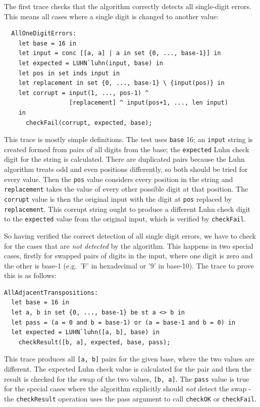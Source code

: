 \documentclass{overturerepchap}
\begin{document}
The first trace checks that the algorithm correctly detects all single-digit
errors. This means all cases where a single digit is changed to another value:

\small
\begin{lstlisting}
  AllOneDigitErrors:
    let base = 16 in
    let input = conc [[a, a] | a in set {0, ..., base-1}] in
    let expected = LUHN`luhn(input, base) in
    let pos in set inds input in
    let replacement in set {0, ..., base-1} \ {input(pos)} in
    let corrupt = input(1, ..., pos-1) ^
                  [replacement] ^ input(pos+1, ..., len input)
    in
      checkFail(corrupt, expected, base);
\end{lstlisting}
\normalsize

\noindent This trace is mostly simple definitions. The test uses \texttt{base}
16; an \texttt{input} string is created formed from pairs of all digits from the base;
the \texttt{expected} Luhn check digit for the string is calculated. There are
duplicated pairs because the Luhn algorithm treats odd and even positions
differently, so both should be tried for every value. Then the \texttt{pos}
value considers every position in the string and \texttt{replacement} takes the
value of every other possible digit at that position. The \texttt{corrupt}
value is then the original input with the digit at \texttt{pos} replaced by
\texttt{replacement}. This corrupt string ought to produce a different Luhn
check digit to the \texttt{expected} value from the original input, which is
verified by \texttt{checkFail}.

So having verified the correct detection of all single digit errors, we have to
check for the cases that are \emph{not detected} by the algorithm. This happens
in two special cases, firstly for swapped pairs of digits in the input, where
one digit is zero and the other is base-1 (e.g.\ 'F' in hexadecimal or '9' in
base-10). The trace to prove this is as follows:

\small
\begin{lstlisting}
AllAdjacentTranspositions:
  let base = 16 in
  let a, b in set {0, ..., base-1} be st a <> b in
  let pass = (a = 0 and b = base-1) or (a = base-1 and b = 0) in
  let expected = LUHN`luhn([a, b], base) in
    checkResult([b, a], expected, base, pass);
\end{lstlisting}
\normalsize

\noindent This trace produces all \texttt{[a, b]} pairs for the given base,
where the two values are different. The expected Luhn check value is calculated for the pair
and then the result is checked for the swap of the two values, \texttt{[b, a]}.
The \texttt{pass} value is true for the special cases where the algorithm
explicitly should \emph{not} detect the swap - the \texttt{checkResult}
operation uses the pass argument to call \texttt{checkOK} or \texttt{checkFail}.
\end{document}
